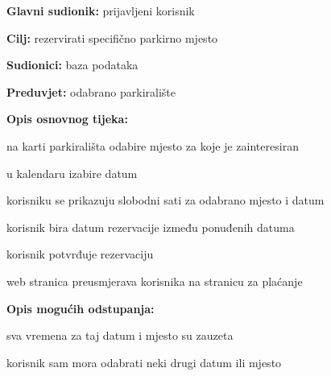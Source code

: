 					\noindent {}
					\begin{packed_item}
						
						\item \textbf{Glavni sudionik: }prijavljeni korisnik
						\item  \textbf{Cilj:} rezervirati specifično parkirno mjesto
						\item  \textbf{Sudionici:} baza podataka
						\item  \textbf{Preduvjet:} odabrano parkiralište
						\item  \textbf{Opis osnovnog tijeka:}
						
						\item[] \begin{packed_enum}
							
							
							\item na karti parkirališta odabire mjesto za koje je zainteresiran
							\item u kalendaru izabire datum
							\item korisniku se prikazuju slobodni sati za odabrano mjesto i datum
							\item korisnik bira datum rezervacije između ponuđenih datuma
							\item korisnik potvrđuje rezervaciju
							\item web stranica preusmjerava korisnika na stranicu za plaćanje
						\end{packed_enum}
						
						\item  \textbf{Opis mogućih odstupanja:}
						
						\item[] \begin{packed_item}
							
							\item[4.a] sva vremena za taj datum i mjesto su zauzeta
							\item[] \begin{packed_enum}
								
								\item korisnik sam mora odabrati neki drugi datum ili mjesto
								
							\end{packed_enum}
					
							
						\end{packed_item}
					\end{packed_item}
					

